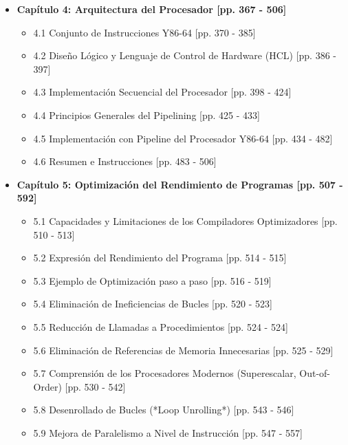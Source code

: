 \documentclass[11pt,a4paper]{article}
\begin{document}
\begin{itemize}
\begin{itemize}
\begin{itemize}
            \item 3.9 Estructuras de Datos Heterogéneas (Structs, Unions, Alineamiento de Datos) [pp. 275 - 285]
            \item 3.10 Punteros en Código de Máquina y Vulnerabilidades de Desbordamiento de Buffer [pp. 286 - 366]
        \end{itemize}
        \item \textbf{Capítulo 4: Arquitectura del Procesador [pp. 367 - 506]}
        \begin{itemize}
            \item 4.1 Conjunto de Instrucciones Y86-64 [pp. 370 - 385]
            \item 4.2 Diseño Lógico y Lenguaje de Control de Hardware (HCL) [pp. 386 - 397]
            \item 4.3 Implementación Secuencial del Procesador [pp. 398 - 424]
            \item 4.4 Principios Generales del Pipelining [pp. 425 - 433]
            \item 4.5 Implementación con Pipeline del Procesador Y86-64 [pp. 434 - 482]
            \item 4.6 Resumen e Instrucciones [pp. 483 - 506]
        \end{itemize}
        \item \textbf{Capítulo 5: Optimización del Rendimiento de Programas [pp. 507 - 592]}
        \begin{itemize}
            \item 5.1 Capacidades y Limitaciones de los Compiladores Optimizadores [pp. 510 - 513]
            \item 5.2 Expresión del Rendimiento del Programa [pp. 514 - 515]
            \item 5.3 Ejemplo de Optimización paso a paso [pp. 516 - 519]
            \item 5.4 Eliminación de Ineficiencias de Bucles [pp. 520 - 523]
            \item 5.5 Reducción de Llamadas a Procedimientos [pp. 524 - 524]
            \item 5.6 Eliminación de Referencias de Memoria Innecesarias [pp. 525 - 529]
            \item 5.7 Comprensión de los Procesadores Modernos (Superescalar, Out-of-Order) [pp. 530 - 542]
            \item 5.8 Desenrollado de Bucles (*Loop Unrolling*) [pp. 543 - 546]
            \item 5.9 Mejora de Paralelismo a Nivel de Instrucción [pp. 547 - 557]

\end{itemize}
\end{itemize}
\end{itemize}
\end{document}
